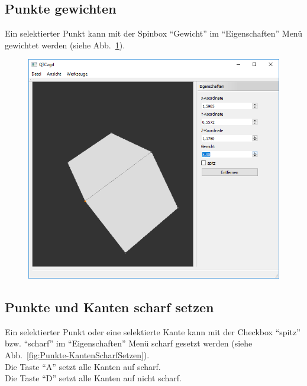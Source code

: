 \subsection{Punkte gewichten}
Ein selektierter Punkt kann mit der Spinbox "`Gewicht"' im "`Eigenschaften"' Menü gewichtet werden (siehe Abb.~\ref{fig:PunkteGewichten}).

\begin{figure}[H]
	\centering
	\includegraphics[scale=0.5]{content/pictures/6-PunkteGewichten}
	\caption{}
	\label{fig:PunkteGewichten}
\end{figure}

\subsection{Punkte und Kanten scharf setzen}
Ein selektierter Punkt oder eine selektierte Kante kann mit der Checkbox "`spitz"' bzw. "`scharf"' im "`Eigenschaften"' Menü scharf gesetzt werden (siehe Abb.~\ref{fig:Punkte-KantenScharfSetzen}).\\
Die Taste "`A"' setzt alle Kanten auf scharf.\\
Die Taste "`D"' setzt alle Kanten auf nicht scharf.\\

